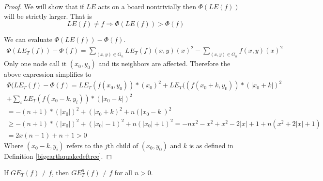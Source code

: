 \documentclass[runningheads,a4paper]{llncs}
\begin{document}
\begin{proof}
We will show that  if $LE$ acts on a board nontrivially then $\Phi(LE(f))$ will be strictly larger. That is  
\begin{equation}
LE(f) \neq f \Rightarrow \Phi(LE(f)) > \Phi(f)
\end{equation}


We can evaluate $\Phi(LE(f)) - \Phi(f)$.
\begin{align}
\Phi(LE_T(f))-\Phi(f) = \sum_{(x,y) \in G_n} LE_T(f)(x,y)(x)^2 - \sum_{(x,y) \in G_n} f(x,y)(x)^2 
\end{align}
Only one node call it $(x_0,y_0)$ and its neighbors are affected. Therefore the above expression simplifies to
\begin{align*}
\Phi(LE_T(f)-\Phi(f) = LE_T( f(x_0,y_0) )* (x_0)^2 + LE_T( (f(x_0+k, y_0) )* (|x_0+k|)^2 \\
+ \sum_{i} LE_T( f(x_0-k, y_i) ) * (|x_0-k|)^2 \\
= -(n+1)*(|x_0|)^2 + (|x_0+k)^2 + n (|x_0-k|)^2 \\
\geq-(n+1)*(|x_0|)^2 + (|x_0|-1)^2 + n (|x_0|+1)^2
= -nx^2-x^2+x^2-2|x|+1+n(x^2+2|x|+1) \\
= 2x(n-1)+n+1 > 0
\end{align*}
Where $(x_0-k,y_i)$ refers to the $j$th child of $(x_0,y_0)$ and $k$ is as defined in Definition \ref{bigearthquakedeftree}.
\end{proof}

\begin{lemma}
If $GE_T(f) \neq f$, then $GE_T^n(f) \neq f$ for all $n > 0$.
\end{lemma}
\end{document}
